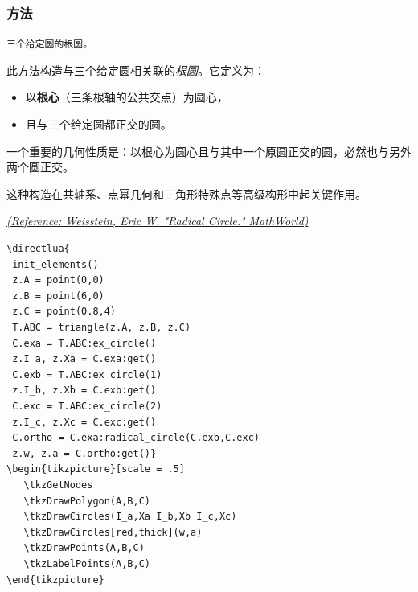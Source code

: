 \subsubsection{方法 }
\label{ssub:radical_circle}

\texttt{三个给定圆的根圆。}

\medskip

此方法构造与三个给定圆相关联的\emph{根圆}。它定义为：

\begin{itemize}
  \item 以\textbf{根心}（三条根轴的公共交点）为圆心，
  \item 且与三个给定圆都正交的圆。
\end{itemize}


一个重要的几何性质是：以根心为圆心且与其中一个原圆正交的圆，必然也与另外两个圆正交。

\medskip

这种构造在共轴系、点幂几何和三角形特殊点等高级构形中起关键作用。
\begin{flushright}
\small
\href{https://mathworld.wolfram.com/RadicalCircle.html}{\textit{(Reference: Weisstein, Eric W. "Radical Circle." MathWorld)}}
\end{flushright}

\vspace{1em}



\begin{minipage}[t]{.5\textwidth}\vspace{0pt}%
\begin{verbatim}
\directlua{
 init_elements()
 z.A = point(0,0)
 z.B = point(6,0)
 z.C = point(0.8,4)
 T.ABC = triangle(z.A, z.B, z.C)
 C.exa = T.ABC:ex_circle()
 z.I_a, z.Xa = C.exa:get()
 C.exb = T.ABC:ex_circle(1)
 z.I_b, z.Xb = C.exb:get()
 C.exc = T.ABC:ex_circle(2)
 z.I_c, z.Xc = C.exc:get()
 C.ortho = C.exa:radical_circle(C.exb,C.exc)
 z.w, z.a = C.ortho:get()}
\begin{tikzpicture}[scale = .5]
   \tkzGetNodes
   \tkzDrawPolygon(A,B,C)
   \tkzDrawCircles(I_a,Xa I_b,Xb I_c,Xc)
   \tkzDrawCircles[red,thick](w,a)
   \tkzDrawPoints(A,B,C)
   \tkzLabelPoints(A,B,C)
\end{tikzpicture}
\end{verbatim}
\end{minipage}



